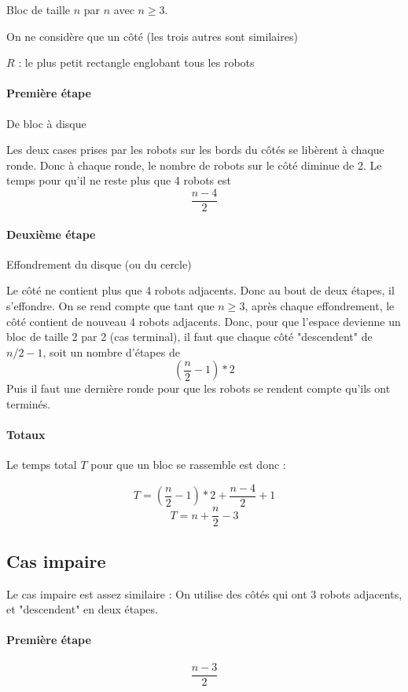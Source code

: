 \documentclass[11pt, a4paper]{article}
\begin{document}
Bloc de taille $n$ par $n$ avec $n \geq 3$.

On ne considère que un côté (les trois autres sont similaires)

$R$ : le plus petit rectangle englobant tous les robots

\paragraph{Première étape} De bloc à disque

Les deux cases prises par les robots sur les bords du côtés se libèrent à
chaque ronde. Donc à chaque ronde, le nombre de robots sur le côté diminue de
2. Le temps pour qu'il ne reste plus que 4 robots est
\[ \frac{n-4}{2} \]

\paragraph{Deuxième étape} Effondrement du disque (ou du cercle)

Le côté ne contient plus que 4 robots adjacents. Donc au bout de deux
étapes, il s'effondre. On se rend compte que tant que $n \geq 3$,
après chaque effondrement, le côté contient de nouveau 4 robots adjacents. Donc,
pour que l'espace devienne un bloc de taille 2 par 2 (cas terminal), il faut
que chaque côté "descendent" de $n/2-1$, soit un nombre d'étapes de
\[ ( \frac{n}{2} -1 ) *2 \]
Puis il faut une dernière ronde pour que les robots se rendent compte qu'ils
ont terminés.

\paragraph{Totaux} Le temps total $T$ pour que un bloc se rassemble
est donc :

\[ T = ( \frac{n}{2} -1 ) *2 + \frac{n-4}{2} + 1 \]
\[ T = n + \frac{n}{2} - 3 \]


\subsection{Cas impaire}

Le cas impaire est assez similaire :
On utilise des côtés qui ont 3 robots adjacents, et "descendent" en deux
étapes.

\paragraph{Première étape}
\[ \frac{n-3}{2} \]
\end{document}
